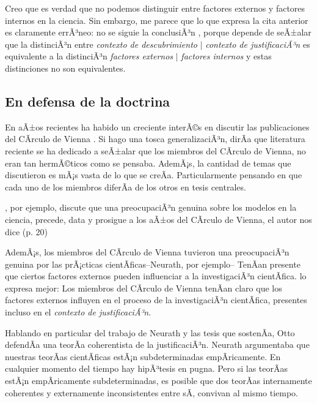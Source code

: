 Creo que es verdad que no podemos distinguir entre factores externos y factores internos en la ciencia.
Sin embargo, me parece que lo que expresa la cita anterior es claramente errÃ³neo: no se siguie la conclusiÃ³n , porque depende de seÃ±alar que la distinciÃ³n entre  \emph{contexto de descubrimiento} $|$ \emph{contexto de justificaciÃ³n} es equivalente a la distinciÃ³n \emph{factores externos} $|$ \emph{factores internos} y estas distinciones no son equivalentes.



\subsection{En defensa de la doctrina}

\noindent En aÃ±os recientes ha habido un creciente interÃ©s en discutir las publicaciones del CÃ­rculo de Vienna \parencite{Bentley2023, Richardson2023, Suarez2024, Riel2014}.
Si hago una tosca generalizaciÃ³n, dirÃ­a que literatura reciente se ha dedicado a seÃ±alar que los miembros del CÃ­rculo de Vienna, no eran tan hermÃ©ticos como se pensaba.
AdemÃ¡s, la cantidad de temas que discutieron es mÃ¡s vasta de lo que se creÃ­a.
Particularmente pensando en que cada uno de los miembros diferÃ­a de los otros en tesis centrales.

\textcite{Suarez2024}, por ejemplo, discute que una preocupaciÃ³n genuina sobre los modelos en la ciencia, precede, data y prosigue a los aÃ±os del CÃ­rculo de Vienna, el autor nos dice  (p. 20)

AdemÃ¡s, los miembros del CÃ­rculo de Vienna tuvieron una preocupaciÃ³n genuina por las prÃ¡cticas cientÃ­ficas--Neurath, por ejemplo--
TenÃ­an presente que ciertos factores externos pueden influenciar a la investigaciÃ³n cientÃ­fica.
\textcite[p. 24]{Bentley2023} lo expresa mejor: 
Los miembros del CÃ­rculo de Vienna tenÃ­an claro que los factores externos influyen en el proceso de la investigaciÃ³n cientÃ­fica, presentes incluso en el \emph{contexto de justificaciÃ³n}.

Hablando en particular del trabajo de Neurath y las tesis que sostenÃ­a, Otto defendÃ­a una teorÃ­a coherentista de la justificaciÃ³n.
Neurath argumentaba que nuestras teorÃ­as cientÃ­ficas estÃ¡n subdeterminadas empÃ­ricamente.
En cualquier momento del tiempo hay hipÃ³tesis en pugna.
Pero si las teorÃ­as estÃ¡n empÃ­ricamente subdeterminadas, es posible que dos teorÃ­as internamente coherentes y externamente inconsistentes entre sÃ­, convivan al mismo tiempo.


